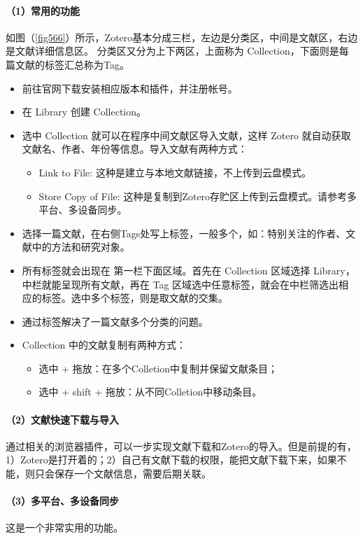 \paragraph{（1）常用的功能}
如图（\ref{fig566}）所示，Zotero基本分成三栏，左边是分类区，中间是文献区，右边是文献详细信息区。
分类区又分为上下两区，上面称为 Collection，下面则是每篇文献的标签汇总称为Tag。
\begin{itemize}
\item 前往官网下载安装相应版本和插件，并注册帐号。
\item 在 Library 创建 Collection。
\item 选中 Collection 就可以在程序中间文献区导入文献，这样 Zotero 就自动获取文献名、作者、年份等信息。导入文献有两种方式：
\begin{itemize}
\item Link to File: 这种是建立与本地文献链接，不上传到云盘模式。
\item Store Copy of File: 这种是复制到Zotero存贮区上传到云盘模式。请参考多平台、多设备同步。
\end{itemize}
\item 选择一篇文献，在右侧Tags处写上标签，一般多个，如：特别关注的作者、文献中的方法和研究对象。
\item 所有标签就会出现在 第一栏下面区域。首先在 Collection 区域选择 Library，中栏就能呈现所有文献，再在 Tag 区域选中任意标签，就会在中栏筛选出相应的标签。选中多个标签，则是取文献的交集。
\item 通过标签解决了一篇文献多个分类的问题。
\item Collection 中的文献复制有两种方式：
\begin{itemize}
\item 选中 + 拖放：在多个Colletion中复制并保留文献条目； 
\item 选中 + shift + 拖放：从不同Colletion中移动条目。
\end{itemize}
\end{itemize}



\paragraph{（2）文献快速下载与导入}
通过相关的浏览器插件，可以一步实现文献下载和Zotero的导入。但是前提的有，1）Zotero是打开着的；2）自己有文献下载的权限，能把文献下载下来，如果不能，则只会保存一个文献信息，需要后期关联。



\paragraph{（3）多平台、多设备同步}
这是一个非常实用的功能。

